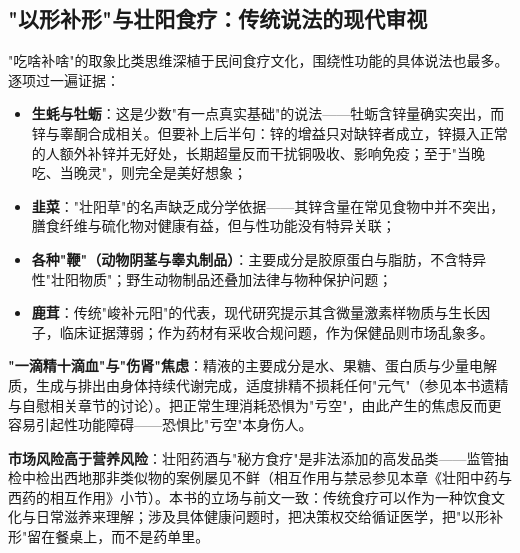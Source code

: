 \subsection{"以形补形"与壮阳食疗：传统说法的现代审视}

"吃啥补啥"的取象比类思维深植于民间食疗文化，围绕性功能的具体说法也最多。逐项过一遍证据：

\begin{itemize}
\item \textbf{生蚝与牡蛎}：这是少数"有一点真实基础"的说法——牡蛎含锌量确实突出，而锌与睾酮合成相关。但要补上后半句：锌的增益只对缺锌者成立，锌摄入正常的人额外补锌并无好处，长期超量反而干扰铜吸收、影响免疫；至于"当晚吃、当晚灵"，则完全是美好想象；
\item \textbf{韭菜}："壮阳草"的名声缺乏成分学依据——其锌含量在常见食物中并不突出，膳食纤维与硫化物对健康有益，但与性功能没有特异关联；
\item \textbf{各种"鞭"（动物阴茎与睾丸制品）}：主要成分是胶原蛋白与脂肪，不含特异性"壮阳物质"；野生动物制品还叠加法律与物种保护问题；
\item \textbf{鹿茸}：传统"峻补元阳"的代表，现代研究提示其含微量激素样物质与生长因子，临床证据薄弱；作为药材有采收合规问题，作为保健品则市场乱象多。
\end{itemize}

\textbf{"一滴精十滴血"与"伤肾"焦虑}：精液的主要成分是水、果糖、蛋白质与少量电解质，生成与排出由身体持续代谢完成，适度排精不损耗任何"元气"（参见本书遗精与自慰相关章节的讨论）。把正常生理消耗恐惧为"亏空"，由此产生的焦虑反而更容易引起性功能障碍——恐惧比"亏空"本身伤人。

\textbf{市场风险高于营养风险}：壮阳药酒与"秘方食疗"是非法添加的高发品类——监管抽检中检出西地那非类似物的案例屡见不鲜（相互作用与禁忌参见本章《壮阳中药与西药的相互作用》小节）。本书的立场与前文一致：传统食疗可以作为一种饮食文化与日常滋养来理解；涉及具体健康问题时，把决策权交给循证医学，把"以形补形"留在餐桌上，而不是药单里。
